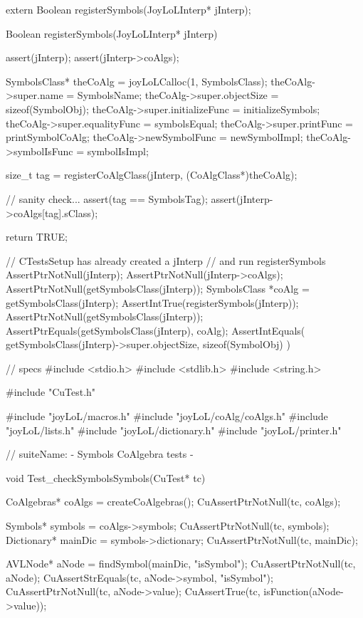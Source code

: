 \startCHeader
extern Boolean registerSymbols(JoyLoLInterp* jInterp);
\stopCHeader
{}

\startCCode
Boolean registerSymbols(JoyLoLInterp* jInterp) {
  assert(jInterp);
  assert(jInterp->coAlgs);
  
  SymbolsClass* theCoAlg = joyLoLCalloc(1, SymbolsClass);
  theCoAlg->super.name           = SymbolsName;
  theCoAlg->super.objectSize     = sizeof(SymbolObj);
  theCoAlg->super.initializeFunc = initializeSymbols;
  theCoAlg->super.equalityFunc   = symbolsEqual;
  theCoAlg->super.printFunc      = printSymbolCoAlg;
  theCoAlg->newSymbolFunc        = newSymbolImpl;
  theCoAlg->symbolIsFunc         = symbolIsImpl;

  size_t tag =
    registerCoAlgClass(jInterp, (CoAlgClass*)theCoAlg);
  
  // sanity check...
  assert(tag == SymbolsTag);
  assert(jInterp->coAlgs[tag].sClass);

  return TRUE;
}
\stopCCode


\startCTest
  // CTestsSetup has already created a jInterp
  // and run registerSymbols
  AssertPtrNotNull(jInterp);
  AssertPtrNotNull(jInterp->coAlgs);
  AssertPtrNotNull(getSymbolsClass(jInterp));
  SymbolsClass *coAlg = getSymbolsClass(jInterp);
  AssertIntTrue(registerSymbols(jInterp));
  AssertPtrNotNull(getSymbolsClass(jInterp));
  AssertPtrEquals(getSymbolsClass(jInterp), coAlg);
  AssertIntEquals(
    getSymbolsClass(jInterp)->super.objectSize,
    sizeof(SymbolObj)
  )
\stopCTest
\stopTestCase
\stopTestSuite


\starttyping
// specs
#include <stdio.h>
#include <stdlib.h>
#include <string.h>

#include "CuTest.h"

#include "joyLoL/macros.h"
#include "joyLoL/coAlg/coAlgs.h"
#include "joyLoL/lists.h"
#include "joyLoL/dictionary.h"
#include "joyLoL/printer.h"

// suiteName: - Symbols CoAlgebra tests -

void Test_checkSymbolsSymbols(CuTest* tc) {
  CoAlgebras* coAlgs = createCoAlgebras();
  CuAssertPtrNotNull(tc, coAlgs);

  Symbols* symbols = coAlgs->symbols;
  CuAssertPtrNotNull(tc, symbols);
  Dictionary* mainDic = symbols->dictionary;
  CuAssertPtrNotNull(tc, mainDic);

  AVLNode* aNode = findSymbol(mainDic, "isSymbol");
  CuAssertPtrNotNull(tc, aNode);
  CuAssertStrEquals(tc, aNode->symbol, "isSymbol");
  CuAssertPtrNotNull(tc, aNode->value);
  CuAssertTrue(tc, isFunction(aNode->value));
}
\stoptyping